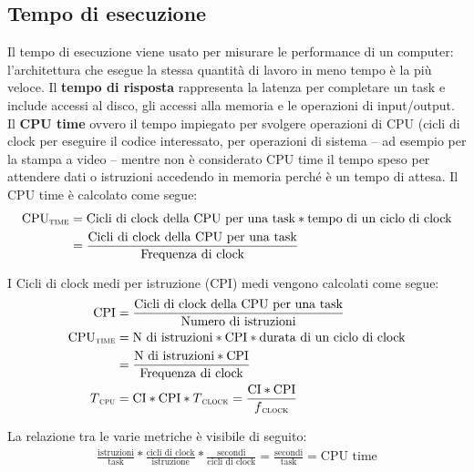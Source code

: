\subsection{Tempo di esecuzione} Il tempo di esecuzione viene usato per misurare le performance di un computer: l'architettura che esegue la stessa quantità di lavoro in meno tempo è la più veloce. Il \textbf{tempo di risposta} rappresenta la latenza per completare un task e include accessi al disco, gli accessi alla memoria e le operazioni di input/output. Il \textbf{CPU time} ovvero il tempo impiegato per svolgere operazioni di CPU (cicli di clock per eseguire il codice interessato, per operazioni di sistema -- ad esempio per la stampa a video -- mentre non è considerato CPU time il tempo speso per attendere dati o istruzioni accedendo in memoria perché è un tempo di attesa. 
Il CPU time è calcolato come segue:
\begin{align*}
\text{CPU\textsubscript{\textsc{time}}} &= \text{Cicli di clock della CPU per una task} * \text{tempo di un ciclo di clock}\\
&= \frac{\text{Cicli di clock della CPU per una task}}{\text{Frequenza di clock}}
\end{align*}

I Cicli di clock medi per istruzione (CPI) medi vengono calcolati come segue:
\begin{align*}
\text{CPI} &= \frac{\text{Cicli di clock della CPU per una task}}{\text{Numero di istruzioni}}\\
\text{CPU\textsubscript{\textsc{time}}} &= \text{N di istruzioni} * \text{CPI} * \text{durata di un ciclo di clock}\\
&= \frac{\text{N di istruzioni} * \text{CPI}}{\text{Frequenza di clock}}\\
T\textsubscript{\textsc{{cpu}}} &= \text{CI}* \text{CPI} * T\textsubscript{\textsc{clock}} = \frac{\text{CI} * \text{CPI}}{f\textsubscript{\textsc{{clock}}}}
\end{align*}

La relazione tra le varie metriche è visibile di seguito:
\begin{align*}
    \frac{\text{istruzioni}}{\text{task}} * \frac{\text{cicli di clock}}{\text{istruzione}} * \frac{\text{secondi}}{\text{cicli di clock}}= \frac{\text{secondi}}{\text{task}} = \text{CPU time}
\end{align*}

